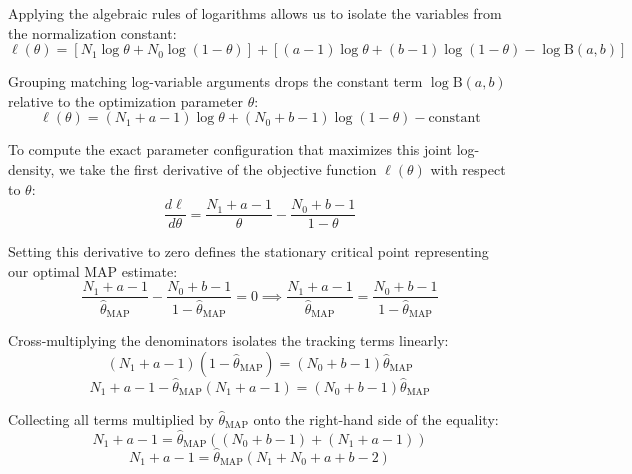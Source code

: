 \documentclass{article}
\begin{document}
Applying the algebraic rules of logarithms allows us to isolate the variables from the normalization constant:
\begin{equation}
\ell(\theta) = \left[ N_1 \log \theta + N_0 \log(1 - \theta) \right] + \left[ (a - 1) \log \theta + (b - 1) \log(1 - \theta) - \log \text{B}(a, b) \right]
\end{equation}

Grouping matching log-variable arguments drops the constant term $\log \text{B}(a, b)$ relative to the optimization parameter $\theta$:
\begin{equation}
\ell(\theta) = (N_1 + a - 1) \log \theta + (N_0 + b - 1) \log(1 - \theta) - \text{constant}
\end{equation}

To compute the exact parameter configuration that maximizes this joint log-density, we take the first derivative of the objective function $\ell(\theta)$ with respect to $\theta$:
\begin{equation}
\frac{d\ell}{d\theta} = \frac{N_1 + a - 1}{\theta} - \frac{N_0 + b - 1}{1 - \theta}
\end{equation}

Setting this derivative to zero defines the stationary critical point representing our optimal $\text{MAP}$ estimate:
\begin{equation}
\frac{N_1 + a - 1}{\hat{\theta}_{\text{MAP}}} - \frac{N_0 + b - 1}{1 - \hat{\theta}_{\text{MAP}}} = 0 \implies \frac{N_1 + a - 1}{\hat{\theta}_{\text{MAP}}} = \frac{N_0 + b - 1}{1 - \hat{\theta}_{\text{MAP}}}
\end{equation}

Cross-multiplying the denominators isolates the tracking terms linearly:
\begin{equation}
(N_1 + a - 1)(1 - \hat{\theta}_{\text{MAP}}) = (N_0 + b - 1)\hat{\theta}_{\text{MAP}}
\end{equation}
\begin{equation}
N_1 + a - 1 - \hat{\theta}_{\text{MAP}}(N_1 + a - 1) = (N_0 + b - 1)\hat{\theta}_{\text{MAP}}
\end{equation}

Collecting all terms multiplied by $\hat{\theta}_{\text{MAP}}$ onto the right-hand side of the equality:
\begin{equation}
  N_1 + a - 1 = \hat{\theta}_{\text{MAP}} \left( (N_0 + b - 1) + (N_1 + a - 1) \right)
\end{equation}
\begin{equation}
N_1 + a - 1 = \hat{\theta}_{\text{MAP}} (N_1 + N_0 + a + b - 2)
\end{equation}
\end{document}
